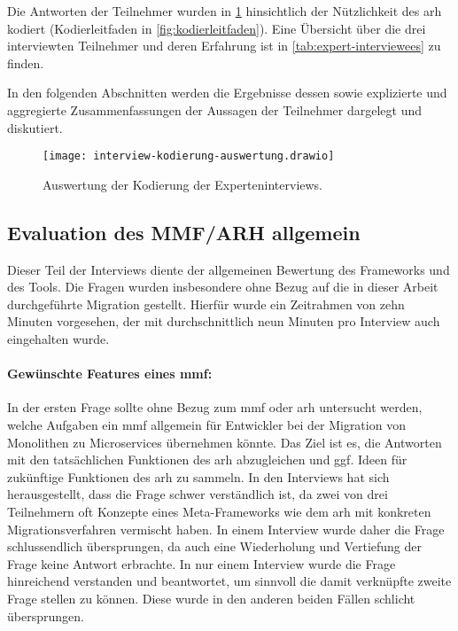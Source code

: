 Die Antworten der Teilnehmer wurden in \cref{fig:auswertung-interviews-kodierung} hinsichtlich der Nützlichkeit des \gls{arh} kodiert (Kodierleitfaden in \cref{fig:kodierleitfaden}).
Eine Übersicht über die drei interviewten Teilnehmer und deren Erfahrung ist in \cref{tab:expert-interviewees} zu finden.

In den folgenden Abschnitten werden die Ergebnisse dessen sowie explizierte und aggregierte Zusammenfassungen der Aussagen der Teilnehmer dar\-ge\-legt und diskutiert.

\begin{figure}%
	\centering
	\texttt{[image: interview-kodierung-auswertung.drawio]}
	\caption[Auswertung Kodierung Experteninterviews]{
		Auswertung der Kodierung der Experteninterviews.
	}
	\label{fig:auswertung-interviews-kodierung}
\end{figure}


\subsection{Evaluation des MMF/ARH allgemein}
\label{sec:evaluation-mmf-allgemein}

Dieser Teil der Interviews diente der allgemeinen Bewertung des Frameworks und des Tools.
Die Fragen wurden insbesondere ohne Bezug auf die in dieser Arbeit durchgeführte Migration gestellt.
Hierfür wurde ein Zeitrahmen von zehn Minuten vorgesehen, der mit durchschnittlich neun Minuten pro Interview auch eingehalten wurde.

\paragraph{Gewünschte Features eines \gls{mmf}:} In der ersten Frage sollte ohne Bezug zum \gls{mmf} oder \gls{arh} untersucht werden, welche Aufgaben ein \acrlong{mmf} allgemein für Entwickler bei der Migration von Monolithen zu Microservices übernehmen könnte.
Das Ziel ist es, die Antworten mit den tatsächlichen Funktionen des \gls{arh} abzugleichen und ggf. Ideen für zukünftige Funktionen des \gls{arh} zu sammeln.
In den Interviews hat sich herausgestellt, dass die Frage schwer verständlich ist, da zwei von drei Teilnehmern oft Konzepte eines Meta-Frameworks wie dem \gls{arh} mit konkreten Migrationsverfahren vermischt haben.
In einem Interview wurde daher die Frage schlussendlich übersprungen, da auch eine Wiederholung und Vertiefung der Frage keine Antwort erbrachte.
In nur einem Interview wurde die Frage hinreichend verstanden und beantwortet, um sinnvoll die damit verknüpfte zweite Frage stellen zu können.
Diese wurde in den anderen beiden Fällen schlicht übersprungen.

